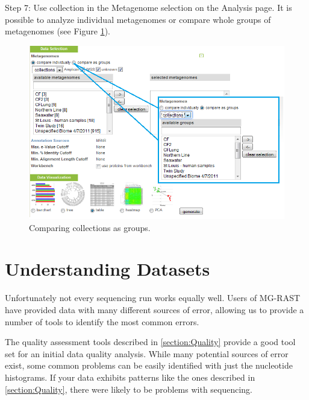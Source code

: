 \documentclass[12pt,fullpage]{report}
\begin{document}
Step 7: Use collection in the Metagenome selection on the Analysis page. It is possible to analyze individual metagenomes or compare whole groups of metagenomes (see Figure \ref{fig:using-collections}).

\begin{figure}[ht]
\begin{center}
\includegraphics[width=6in]{Images/using-collections.png}
\end{center}
\caption{
Comparing collections as groups.}
\label{fig:using-collections}
\end{figure}







\section{Understanding Datasets}
Unfortunately not every sequencing run works equally well. Users of MG-RAST have provided data with
many different sources of error, allowing us to provide a number of tools to identify the most common errors.

The quality assessment tools described in \ref{section:Quality} provide a good tool set for an initial data quality analysis. While many potential sources of error exist, some common problems can be easily identified with just the nucleotide histograms. If your data exhibits patterns like the ones described in \ref{section:Quality}, there were likely to be problems with sequencing.
\end{document}
